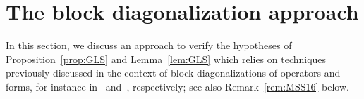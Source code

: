 \documentclass[11pt,a4paper]{amsart}
\numberwithin{equation}{section}
\theoremstyle{plain}
\theoremstyle{definition}
\theoremstyle{remark}
\begin{document}
\section{The block diagonalization approach}\label{sec:blockDiag}

In this section, we discuss an approach to verify the hypotheses of Proposition~\ref{prop:GLS} and Lemma~\ref{lem:GLS} which
relies on techniques previously discussed in the context of block diagonalizations of operators and forms, for instance
in~\cite{MSS16} and~\cite{GKMSV17}, respectively; see also Remark~\ref{rem:MSS16} below.
\end{document}
